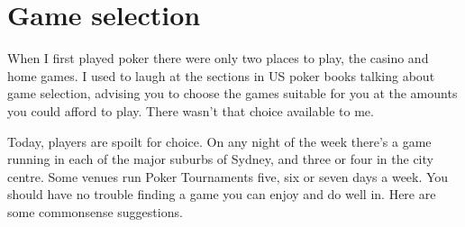 \chapter{Game selection}


When I first played poker there were only two places to
play, the casino and home games.
I used to laugh at the sections in US poker books talking about
game selection, advising you to choose the games suitable for you at
the amounts you could afford to play. There wasn't that
choice available to me.

Today, players are spoilt for choice. On any night
of the week there's a game running in each of
the major suburbs of Sydney, and three or four in
the city centre. Some venues run Poker Tournaments five, six or seven
days a week. You should have no trouble finding a game
you can enjoy and do well in. Here are some commonsense
suggestions.

